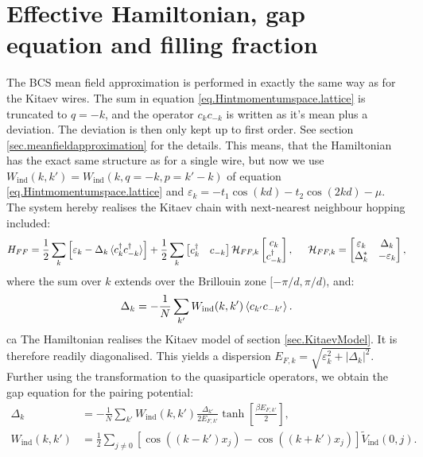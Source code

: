\section{Effective Hamiltonian, gap equation and filling fraction} \label{sec.grandhamiltonian.lattice}
The BCS mean field approximation is performed in exactly the same way as for the Kitaev wires. The sum in equation \eqref{eq.Hintmomentumspace.lattice} is truncated to $q = -k$, and the operator $c_kc_{-k}$ is written as it's mean plus a deviation. The deviation is then only kept up to first order. See section \ref{sec.meanfieldapproximation} for the details. This means, that the Hamiltonian has the exact same structure as for a single wire, but now we use $W_{\text{ind}}(k, k') = W_{\text{ind}}(k, q = -k, p = k' - k)$ of equation \eqref{eq.Hintmomentumspace.lattice} and $\varepsilon_k = - t_1\cos(kd) - t_2\cos(2kd) - \mu$. The system hereby realises the Kitaev chain with next-nearest neighbour hopping included: 
\begin{equation}
H_{FF} = \frac{1}{2}\sum_k \left[\varepsilon_k - \Delta_k \braket {c^\dagger_k c^\dagger_{-k}}\right] + \frac{1}{2}\sum_{k} \begin{bmatrix} c_k^\dagger & c_{-k} \end{bmatrix} \mathcal{H}_{FF,k} \begin{bmatrix} c_k \\ c^\dagger_{-k} \end{bmatrix}, \hspace{0.5cm} \mathcal{H}_{FF,k} = \begin{bmatrix} \varepsilon_k & \Delta_k \\ \Delta^*_k & -\varepsilon_k \end{bmatrix}, 
\label{eq.grandhamiltonian.lattice}
\end{equation}
where the sum over $k$ extends over the Brillouin zone $[-\pi/d, \pi/d )$, and: 
\begin{equation}
\Delta_k = - \frac{1}{N}\sum_{k'} W_{\text{ind}}(k,k')\braket{c_{k'}c_{-k'}}.
\label{eq.pairingpotential.lattice}
\end{equation}ca
The Hamiltonian realises the Kitaev model of section \ref{sec.KitaevModel}. It is therefore readily diagonalised. This yields a dispersion $E_{F,k} = \sqrt{\varepsilon^2_k + |\Delta_k|^2}$. Further using the transformation to the quasiparticle operators, we obtain the gap equation for the pairing potential: 
\begin{align}
\Delta_k &= - \frac{1}{N}\sum_{k'} W_{\text{ind}}(k,k')\frac{\Delta_{k'}}{2E_{F,k'}}\tanh\left[\frac{\beta E_{F,k'}}{2}\right], \nonumber \\
W_{\text{ind}}(k,k') &= \frac{1}{2}\sum_{j\neq 0} \left[\cos((k - k')x_j) - \cos((k + k')x_j) \right]\tilde{V}_{\text{ind}}(0, j).
\label{eq.gapequation.lattice}
\end{align}
